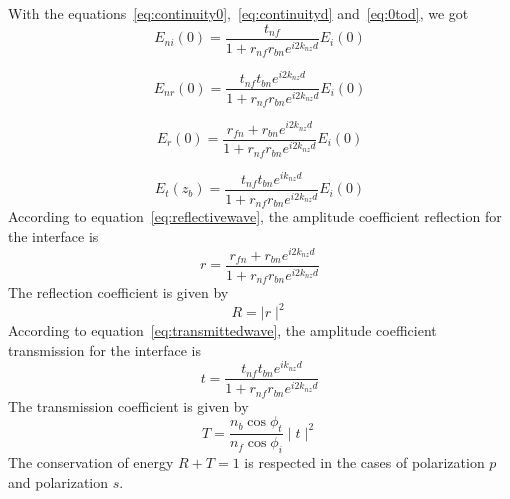 With the equations~\eqref{eq:continuity0},~\eqref{eq:continuityd} and~\eqref{eq:0tod}, we got\\
\begin{equation}
E_{ni}(0)=\frac{t_{nf}}{1+r_{nf}r_{bn}e^{i2k_{nz}d}}E_i(0)
\end{equation}

\begin{equation}
E_{nr}(0)=\frac{t_{nf}t_{bn}e^{i2k_{nz}d}}{1+r_{nf}r_{bn}e^{i2k_{nz}d}}E_i(0)
\end{equation}

\begin{equation}\label{eq:reflectivewave}
E_{r}(0)=\frac{r_{fn}+r_{bn}e^{i2k_{nz}d}}{1+r_{nf}r_{bn}e^{i2k_{nz}d}}E_i(0)
\end{equation}

\begin{equation}\label{eq:transmittedwave}
E_{t}(z_b)=\frac{t_{nf}t_{bn}e^{ik_{nz}d}}{1+r_{nf}r_{bn}e^{i2k_{nz}d}}E_i(0)
\end{equation}
According to equation~\eqref{eq:reflectivewave}, the amplitude coefficient reflection for the interface is\\
$$
r=\frac{r_{fn}+r_{bn}e^{i2k_{nz}d}}{1+r_{nf}r_{bn}e^{i2k_{nz}d}}
$$
The reflection coefficient is given by
\begin{equation*}
R=\mid r\mid^2
\end{equation*}
According to equation~\eqref{eq:transmittedwave}, the amplitude coefficient transmission for the interface is\\
$$
t=\frac{t_{nf}t_{bn}e^{ik_{nz}d}}{1+r_{nf}r_{bn}e^{i2k_{nz}d}}
$$
The transmission coefficient is given by
\begin{equation*}
T=\frac{n_b\cos\phi _t}{n_f\cos\phi _i}\mid t\mid^2
\end{equation*}
The conservation of energy $R+T=1$ is respected in the cases of polarization $p$ and polarization $s$.


